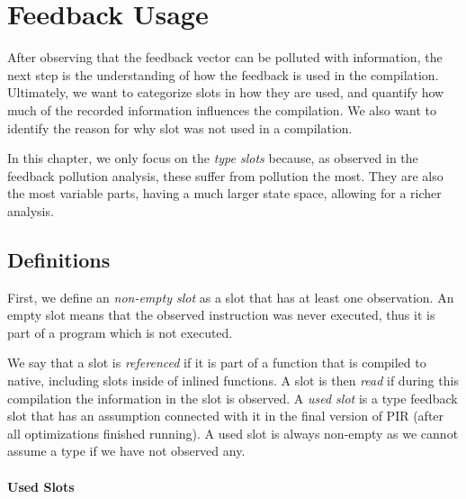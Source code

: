 \chapter{Feedback Usage}

\begin{chapterabstract}
	\todoadd
\end{chapterabstract}

After observing that the feedback vector can be polluted with information, the next step is the understanding of how the feedback is used in the compilation. Ultimately, we want to categorize slots in how they are used, and quantify how much of the recorded information influences the compilation. We also want to identify the reason for why slot was not used in a compilation.

In this chapter, we only focus on the \textit{type slots} because, as observed in the feedback pollution analysis, these suffer from pollution the most. They are also the most variable parts, having a much larger state space, allowing for a richer analysis.

\section{Definitions}

First, we define an \textit{non-empty slot} as a slot that has at least one observation. An empty slot means that the observed instruction was never executed, thus it is part of a program which is not executed.

We say that a slot is \textit{referenced} if it is part of a function that is compiled to native, including slots inside of inlined functions. A slot is then \textit{read} if during this compilation the information in the slot is observed. A \textit{used slot} is a type feedback slot that has an assumption connected with it in the final version of PIR (after all optimizations finished running). A used slot is always non-empty as we cannot assume a type if we have not observed any.

\subsubsection*{Used Slots}

